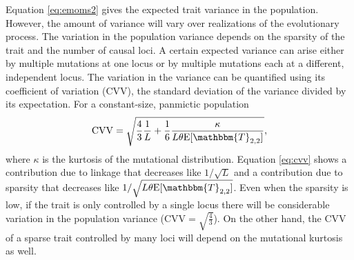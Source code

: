 Equation \eqref{eq:emoms2} gives the expected trait variance in the population.
However, the amount of variance will vary over realizations of the evolutionary
process. The variation in the population variance depends on the sparsity of the
trait and the number of causal loci. A certain expected variance can arise
either by multiple mutations at one locus or by multiple mutations each at a
different, independent locus. The variation in the variance can be quantified
using its coefficient of variation (CVV), the standard deviation of the variance
divided by its expectation. For a constant-size, panmictic population
\begin{equation}
  \label{eq:cvv}
  \mathrm{CVV} = \sqrt{\frac{4}{3}\frac{1}{L} +
    \frac{1}{6}\frac{\kappa}{L\theta \E[\mathbbm{T}_{2,2}]}},
\end{equation}
where $\kappa$ is the kurtosis of the mutational distribution. Equation
\eqref{eq:cvv} shows a contribution due to linkage that decreases like
$1/\sqrt{L}$ and a contribution due to sparsity that decreases like
$1/\sqrt{L\theta \E[\mathbbm{T}_{2,2}]}$. Even when the sparsity is low, if the
trait is only controlled by a single locus there will be considerable variation
in the population variance (CVV$=\sqrt{\frac{4}{3}}$). On the other hand, the
CVV of a sparse trait controlled by many loci will depend on the mutational
kurtosis as well.
